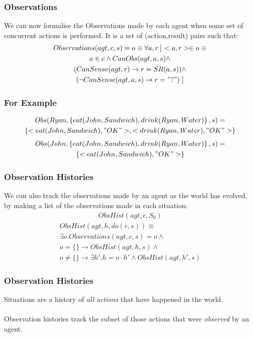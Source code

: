 \documentclass{beamer}
\begin{document}
\begin{frame}
\frametitle{Observations}
We can now formalise the Observations made by each agent when some set of
concurrent actions is performed.  It is a set of (action,result) pairs such
that:
\begin{multline*}
Observations(agt,c,s) = o \equiv \forall a,r \left[\right. <a,r> \in o \equiv \\
  a \in c \wedge CanObs(agt,a,s) \wedge \\
  (CanSense(agt,r) \rightarrow r = SR(a,s)) \wedge \\
  (\neg CanSense(agt,a,s) \rightarrow r = "?") \left.\right]\\
\end{multline*}

\end{frame}

\begin{frame}
\frametitle{For Example}
\begin{multline*}
  Obs(Ryan,\left\{eat(John,Sandwich),drink(Ryan,Water)\right\},s) = \\
     \left\{<eat(John,Sandwich),"OK">,<drink(Ryan,Water),"OK">\right\}
\end{multline*}
\pause
\begin{multline*}
  Obs(John,\left\{eat(John,Sandwich),drink(Ryan,Water)\right\},s) = \\
     \left\{<eat(John,Sandwich),"OK">\right\}
\end{multline*}
\end{frame}

\begin{frame}
\frametitle{Observation Histories}
We can also track the observations made by an agent as the world has evolved,
by making a list of the observations made in each situation:
\begin{multline*}
ObsHist(agt,\epsilon,S_0)
\end{multline*}
\begin{multline*}
ObsHist(agt,h,do(c,s)) \equiv \\
    \exists o . Observations(agt,c,s) = o \wedge \\
    o = \{\} \rightarrow ObsHist(agt,h,s) \wedge \\
    o \not = \{\} \rightarrow \exists h' . h=o\cdot h' \wedge ObsHist(agt,h',s)
\end{multline*}
\end{frame}

\begin{frame}
\frametitle{Observation Histories}
Situations are a history of \emph{all actions} that have happened in the world.
\ \\
\ \\
Observation histories track the subset of those actions that were
\emph{observed} by an agent.
\end{frame}
\end{document}
